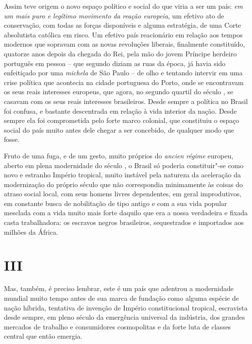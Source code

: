 Assim teve origem o novo espaço político e social do que viria a ser um
país: \emph{em um mais puro e legítimo movimento} \emph{da} \emph{reação
europeia}, um efetivo ato de conservação, com todas as forças
disponíveis e alguma estratégia, de uma Corte absolutista católica em
risco. Um efetivo país reacionário em relação aos tempos modernos que
sopravam com as novas revoluções liberais, finalmente constituído,
quatorze anos depois da chegada do Rei, pela mão do jovem Príncipe
herdeiro português em pessoa -- que segundo diziam as ruas da época, já
havia sido enfeitiçado por uma \emph{michela} de São Paulo -- de olho e
tentando intervir em uma crise política que acontecia na cidade
portuguesa do Porto, onde se encontravam os seus reais interesses
europeus, que agora, no segundo quartil do século , se casavam com os
seus reais interesses brasileiros. Desde sempre a política no Brasil foi
confusa, e bastante descentrada em relação à vida interior da nação.
Desde sempre ela foi comprometida pelo forte marco colonial, que
constituiu o espaço social do país muito antes dele chegar a ser
concebido, de qualquer modo que fosse.

Fruto de uma fuga, e de um gesto, muito próprios do \emph{ancien régime}
europeu, aberto em plena modernidade do século , o Brasil só poderia
constituir"-se como novo e estranho Império tropical, muito instável pela
natureza da aceleração da modernização do próprio século que não
correspondia minimamente às coisas do atraso social local, com seus
homens livres dependentes, em geral improdutivos, em constante busca de
nobilitação de tipo antigo e com a sua vida popular mesclada com a vida
muito mais forte daquilo que era a nossa verdadeira e fixada casta
trabalhadora: os escravos negros brasileiros, sequestrados e importados
aos milhões da África.

\section{III}

Mas, também, é preciso lembrar, este é um país que adentrou a
modernidade mundial muito tempo antes de sua marca de fundação como
alguma espécie de nação híbrida, tentativa de invenção de Império
constitucional tropical, escravista desde sempre, em pleno século da
emergência universal da indústria, dos grandes mercados de trabalho e
consumidores cosmopolitas e da forte luta de classes central que então
emergia.

